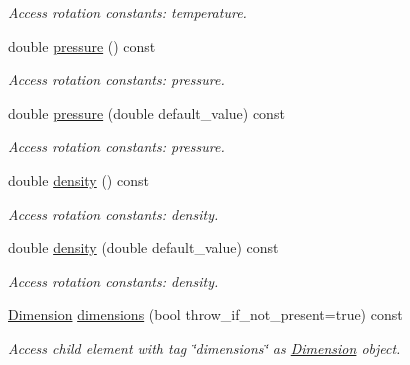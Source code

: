 \begin{DoxyCompactItemize}
\begin{DoxyCompactList}\small\item\em Access rotation constants: temperature. \item\end{DoxyCompactList}\item 
double \hyperlink{struct_d_d4hep_1_1_x_m_l_1_1_dimension_a760be0ff72146dbeb57244adee2d1a6e}{pressure} () const 
\begin{DoxyCompactList}\small\item\em Access rotation constants: pressure. \item\end{DoxyCompactList}\item 
double \hyperlink{struct_d_d4hep_1_1_x_m_l_1_1_dimension_a8863708ff8c219c9c364315e53158315}{pressure} (double default\_\-value) const 
\begin{DoxyCompactList}\small\item\em Access rotation constants: pressure. \item\end{DoxyCompactList}\item 
double \hyperlink{struct_d_d4hep_1_1_x_m_l_1_1_dimension_acbecea58454bf456672bc673f54eb570}{density} () const 
\begin{DoxyCompactList}\small\item\em Access rotation constants: density. \item\end{DoxyCompactList}\item 
double \hyperlink{struct_d_d4hep_1_1_x_m_l_1_1_dimension_af43e6dbff63a271cdd79dd52c2a5f21c}{density} (double default\_\-value) const 
\begin{DoxyCompactList}\small\item\em Access rotation constants: density. \item\end{DoxyCompactList}\item 
\hyperlink{struct_d_d4hep_1_1_x_m_l_1_1_dimension}{Dimension} \hyperlink{struct_d_d4hep_1_1_x_m_l_1_1_dimension_a97c17e031c8a055375bcf59a5119a2cb}{dimensions} (bool throw\_\-if\_\-not\_\-present=true) const 
\begin{DoxyCompactList}\small\item\em Access child element with tag \char`\"{}dimensions\char`\"{} as \hyperlink{struct_d_d4hep_1_1_x_m_l_1_1_dimension}{Dimension} object. \item\end{DoxyCompactList}\item 

\end{DoxyCompactItemize}
